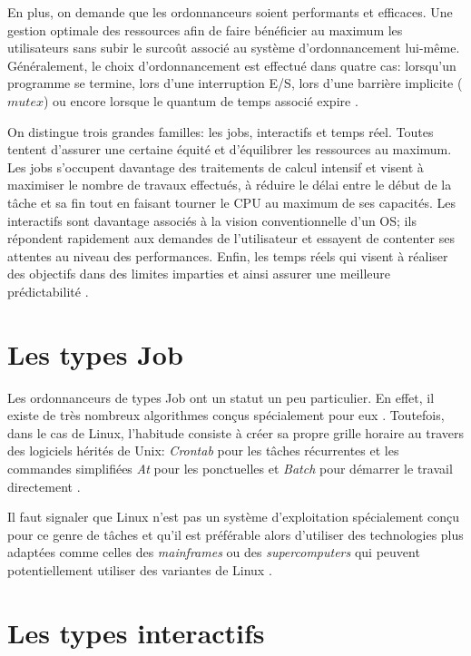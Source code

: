 \documentclass[letterpaper]{article}
\begin{document}
En plus, on demande que les ordonnanceurs soient performants et efficaces. Une gestion optimale des ressources afin de faire bénéficier au maximum les utilisateurs sans subir le surcoût associé au système d'ordonnancement lui-même. Généralement, le choix d'ordonnancement est effectué dans quatre cas: lorsqu'un programme se termine, lors d'une interruption E/S, lors d'une barrière implicite ($mutex$) ou encore lorsque le quantum de temps associé expire \citep{Bovet:2005:ULK:1077084}.

On distingue trois grandes familles: les jobs, interactifs et temps réel. Toutes tentent d'assurer une certaine équité et d'équilibrer les ressources au maximum. Les jobs s'occupent davantage des traitements de calcul intensif et visent à maximiser le nombre de travaux effectués, à réduire le délai entre le début de la tâche et sa fin tout en faisant tourner le CPU au maximum de ses capacités. Les interactifs sont davantage associés à la vision conventionnelle d'un OS; ils répondent rapidement aux demandes de l'utilisateur et essayent de contenter ses attentes au niveau des performances. Enfin, les temps réels qui visent à réaliser des objectifs dans des limites imparties et ainsi assurer une meilleure prédictabilité \citep{Tanenbaum:2005:OSD:1076555}.

\section{Les types Job}

Les ordonnanceurs de types Job ont un statut un peu particulier. En effet, il existe de très nombreux algorithmes conçus spécialement pour eux \citep{journals/cce/MendezCGHF06}. Toutefois, dans le cas de Linux, l'habitude consiste à créer sa propre grille horaire au travers des logiciels hérités de Unix: \textit{Crontab} pour les tâches récurrentes et les commandes simplifiées \textit{At} pour les ponctuelles et \textit{Batch} pour démarrer le travail directement \citep{x1994x}.

Il faut signaler que Linux n'est pas un système d'exploitation spécialement conçu pour ce genre de tâches et qu'il est préférable alors d'utiliser des technologies plus adaptées comme celles des \textit{mainframes} ou des \textit{supercomputers} qui peuvent potentiellement utiliser des variantes de Linux \citep{Encyclopedia:2011}.

\section{Les types interactifs}
\end{document}

